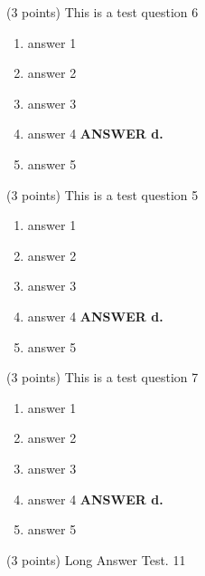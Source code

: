 \documentclass{article}
\newcommand{\ans}[1]{ \ifnum\showans=1 {\bf ANSWER #1.} \fi }
\begin{document}

\item (3 points) This is a test question 6
  \begin{enumerate}
  \item answer 1
  \item answer 2
  \item answer 3
  \item answer 4  \ans{d}
  \item answer 5
  \end{enumerate}

\item (3 points) This is a test question 5
  \begin{enumerate}
  \item answer 1
  \item answer 2
  \item answer 3
  \item answer 4  \ans{d}
  \item answer 5
  \end{enumerate}

\item (3 points) This is a test question 7
  \begin{enumerate}
  \item answer 1
  \item answer 2
  \item answer 3
  \item answer 4  \ans{d}
  \item answer 5
  \end{enumerate}

\item (3 points) Long Answer Test. 11
\end{document}
